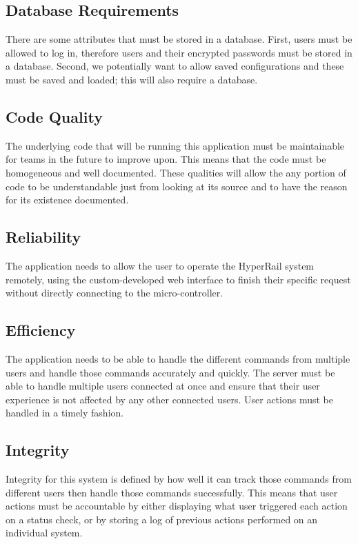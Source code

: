 \documentclass[onecolumn, draftclsnofoot,10pt, compsoc]{IEEEtran}
\begin{document}
\subsection{Database Requirements}
There are some attributes that must be stored in a database. First, users must be allowed to log in, therefore users and their encrypted passwords must be stored in a database. Second, we potentially want to allow saved configurations and these must be saved and loaded; this will also require a database. 

\subsection{Code Quality}
The underlying code that will be running this application must be maintainable for teams in the future to improve upon. This means that the code must be homogeneous and well documented. These qualities will allow the any portion of code to be understandable just from looking at its source and to have the reason for its existence documented.

\subsection{Reliability} 
The application needs to allow the user to operate the HyperRail system remotely, using the custom-developed web interface to finish their specific request without directly connecting to the micro-controller.

\subsection{Efficiency}
The application needs to be able to handle the different commands from multiple users and handle those commands accurately and quickly. The server must be able to handle multiple users connected at once and ensure that their user experience is not affected by any other connected users. User actions must be handled in a timely fashion.

\subsection{Integrity}
Integrity for this system is defined by how well it can track those commands from different users then handle those commands successfully. This means that user actions must be accountable by either displaying what user triggered each action on a status check, or by storing a log of previous actions performed on an individual system.
\end{document}
